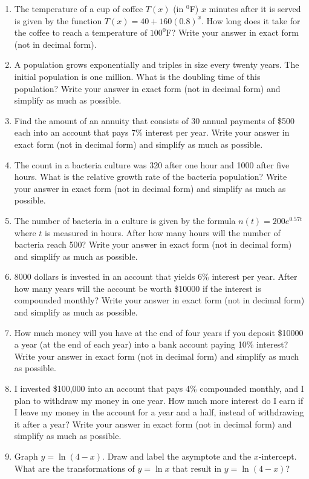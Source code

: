 \documentclass[11pt]{article}
\begin{document}
\begin{enumerate}
\begin{enumerate}
\end{enumerate}
\item The temperature of a cup of coffee $T(x)$  (in $^0$F) $x$ minutes
after it is served is given by the function $\displaystyle T(x) = 40 + 160 (0.8)^x$. How long does it take for the coffee to reach a temperature of $100^0$F?  Write your answer in exact form (not in decimal form).
\item A population grows exponentially and triples in size every twenty years. The initial population is one million. What is the doubling time of this population? Write your answer in exact form (not in decimal form) and simplify as much as possible.
\item Find the amount of an annuity that consists of 30 annual payments of \$500 each into an account that
pays 7\% interest per year. Write your answer in exact form (not in decimal form) and simplify as much as possible.
\item The count in a bacteria culture was 320 after one hour and 1000 after five hours. What is the
relative growth rate of the bacteria population? Write your answer in exact form (not in decimal form) and simplify as much as possible.
\item The number of bacteria in a culture is given by the formula $\displaystyle n(t ) = 200e^{0.57t}$ where $t$ is measured in
hours. After how many
hours will the number of bacteria reach 500? Write your answer in exact form (not in decimal form) and simplify as much as possible.
\item 8000 dollars is invested in an account that yields 6\% interest per year. After how many years will the account be worth \$10000 if the interest is compounded monthly? Write your answer in exact form (not in decimal form) and simplify as much as possible.
\item How much money will you have at the end of four years if you deposit \$10000 a year (at the end of each year) into a bank account paying 10\% interest? Write your answer in exact form (not in decimal form) and simplify as much as possible.
\item I invested \$100,000 into an account that pays 4\% compounded monthly, and I plan to withdraw my money in one year. How much more interest do I earn if I leave my money in the account for a year and a half, instead of withdrawing it after a year? Write your answer in exact form (not in decimal form) and simplify as much as possible.
\item Graph $\displaystyle y=\ln(4-x)$. Draw and label the asymptote and the $x$-intercept. What are the transformations of $y=\ln x$ that result in $\displaystyle y=\ln(4-x)$?

\end{enumerate}
\end{document}
